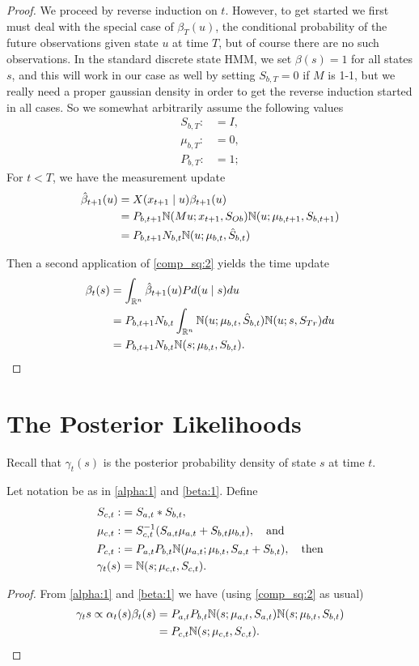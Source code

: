 \documentclass[12pt,leqno]{article}
\begin{document}
\begin{proof}
We proceed by reverse induction on $t$. However, to get started we first must  deal with
the special case of $\beta_{T}(u)$, the conditional probability of the future observations given
state $u$ at time $T$, but of course there are no such observations.  In the standard discrete
state HMM, we set $\beta(s) = 1$ for all states $s$, and this will work in our case as well by
setting $S_{b,T} = 0$ if $M$ is 1-1, but we really need a proper gaussian 
density in order to get the reverse induction started in all cases.  So we somewhat arbitrarily
assume the following values
\begin{align*}
  S_{b,T} :&= I,\\
  \mu_{b,T} :&= 0,\\
  P_{b,T} :&= 1;
\end{align*}
  For $t <  T$, we have the measurement update 
  \begin{align*}
    \hat{\beta}_{t+1}(u) &= X(x_{t+1}\mid u)\beta_{t+1}(u)\\
    &= P_{b,t+1}{\mathbb N}(Mu;x_{t+1},S_{Ob}){\mathbb N}(u;\mu_{b,t+1},S_{b,t+1})\\
    &= P_{b,t+1}N_{b,t}{\mathbb N}(u;\mu_{b,t},\hat{S}_{b,t})
  \end{align*}

  Then a second application of \eqref{comp_sq:2} yields the time update
  \begin{align*}
    \beta_t(s) &= \int_{{\mathbb R}^n}\hat{\beta}_{t+1}(u)Pd(u\mid s)du \\
    &= P_{b,t+1}N_{b,t}\int_{{\mathbb R}^n}{\mathbb N}(u;\mu_{b,t},\hat{S}_{b,t}){\mathbb N}(u;s,S_{Tr})du\\
    &=P_{b,t+1}N_{b,t}{\mathbb N}(s;\mu_{b,t},S_{b,t}).
  \end{align*}
\end{proof}

\section{The Posterior Likelihoods}
Recall that $\gamma_t(s)$ is the posterior probability density of state $s$
at time $t$. 
\begin{Thm}
  Let notation be as in \eqref{alpha:1} and \eqref{beta:1}.  Define
\begin{align*}
  S_{c,t} :&= S_{a,t}*S_{b,t}, \\
  \mu_{c,t} :&= S_{c,t}^{-1}(S_{a,t}\mu_{a,t} + S_{b,t}\mu_{b,t}), \quad\text{and}\\
  P_{c,t} :&= P_{a,t}P_{b,t}{\mathbb N}(\mu_{a,t};\mu_{b,t},S_{a,t}+S_{b,t}), \quad\text{then} \\
 \gamma_t(s) &= {\mathbb N}(s;\mu_{c,t},S_{c,t}).
  \end{align*}
\end{Thm}
\begin{proof}
  From \eqref{alpha:1} and \eqref{beta:1} we have (using \eqref{comp_sq:2}
  as usual)
  \begin{align*}
  \gamma_t{s} \propto \alpha_t(s)\beta_t(s) &= P_{a,t}P_{b,t}{\mathbb N}(s;\mu_{a,t},S_{a,t}){\mathbb N}(s;\mu_{b,t},S_{b,t})\\
  &= P_{c,t}{\mathbb N}(s;\mu_{c,t},S_{c,t}).
  \end{align*}
\end{proof}
\end{document}
